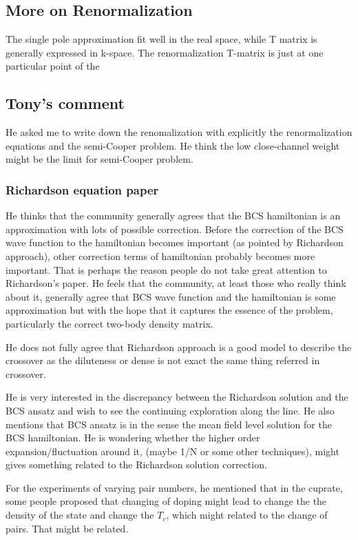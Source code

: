 
 \subsection{More on Renormalization}
 The single pole approximation fit well in the real space, while T matrix is generally expressed in k-space. 
The renormalization T-matrix is just at one particular point of the 

\subsection{Tony's comment}

He asked me to write down the renomalization with explicitly the renormalization equations and the semi-Cooper problem. He think the low close-channel weight might be the limit for semi-Cooper problem.  

\subsubsection{Richardson equation paper}
He thinks that the community generally agrees that the BCS hamiltonian is an approximation with lots of possible correction.  Before the correction of the BCS wave function to the hamiltonian becomes important (as pointed by Richardson approach), other correction terms of hamiltonian probably becomes more important. That is perhaps the reason people do not take great attention to Richardson's paper.  He feels that the community, at least  those who really think about it, generally agree that BCS wave function and the hamiltonian is some approximation but with the hope that it captures the essence of the problem, particularly the correct two-body density matrix. 

He does not fully agree that Richardson approach is a good model to describe the crossover as the diluteness or dense is not exact the same thing referred in crossover.     

He is very interested in the discrepancy between the Richardson solution and the BCS ansatz and wish to see the continuing exploration along the line.   He also mentions that BCS ansatz is in the sense the mean field level solution for the BCS hamiltonian.  He is wondering whether the higher order expansion/fluctuation around it, (maybe 1/N or some other techniques), might gives something related to  the Richardson solution correction.  

For the experiments of varying pair numbers, he mentioned that in the cuprate, some people proposed that changing of doping might lead to change the the density of the state and change the $T_c$, which might related to the change of pairs.  That might be related. 
